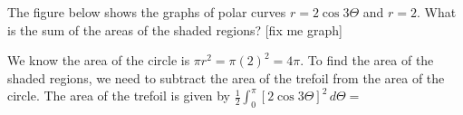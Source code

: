 \begin{Exercise}[label = polar2]
The figure below shows the graphs of polar curves $r = 2\cos{3\Theta}$ and $r = 2$. What is the sum of the areas of the shaded regions?	[fix me graph]
\end{Exercise}

\begin{Answer}[ref = polar2]
We know the area of the circle is $\pi r^2 = \pi(2)^2 = 4\pi$. To find the area of the shaded regions, we need to subtract the area of the trefoil from the area of the circle. The area of the trefoil is given by $\frac{1}{2} \int_0^{\pi} \left[2 \cos{3\Theta} \right]^2\,d\Theta =$
\end{Answer}